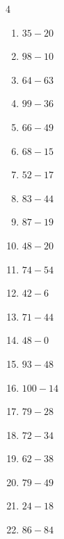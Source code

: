 \begin{multicols}{4}
\begin{enumerate}
  \item $35-20$
        \phantom{$=15$}

  \item $98-10$
        \phantom{$=88$}

  \item $64-63$
        \phantom{$=1$}

  \item $99-36$
        \phantom{$=63$}

  \item $66-49$
        \phantom{$=17$}

  \item $68-15$
        \phantom{$=53$}

  \item $52-17$
        \phantom{$=35$}

  \item $83-44$
        \phantom{$=39$}

  \item $87-19$
        \phantom{$=68$}

  \item $48-20$
        \phantom{$=28$}

  \item $74-54$
        \phantom{$=20$}

  \item $42-6$
        \phantom{$=36$}

  \item $71-44$
        \phantom{$=27$}

  \item $48-0$
        \phantom{$=48$}

  \item $93-48$
        \phantom{$=45$}

  \item $100-14$
        \phantom{$=86$}

\columnbreak %

  \item $79-28$
        \phantom{$=51$}

  \item $72-34$
        \phantom{$=38$}

  \item $62-38$
        \phantom{$=24$}

  \item $79-49$
        \phantom{$=30$}

  \item $24-18$
        \phantom{$=6$}

  \item $86-84$
        \phantom{$=2$}


\end{enumerate}
\end{multicols}
